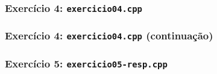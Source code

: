 \documentclass[aspectratio=169]{beamer}
\begin{document}
\begin{frame}[fragile]\frametitle{Exercício 4: \texttt{exercicio04.cpp}}
\fontsize{5pt}{5pt}\selectfont{

}
\end{frame}

\begin{frame}[fragile]\frametitle{Exercício 4: \texttt{exercicio04.cpp} (continuação)}
\fontsize{5pt}{5pt}\selectfont{

}
\end{frame}

\begin{frame}[fragile]\frametitle{Exercício 5: \texttt{exercicio05-resp.cpp}}
\fontsize{6pt}{6pt}\selectfont{

}
\end{frame}

\end{document}
